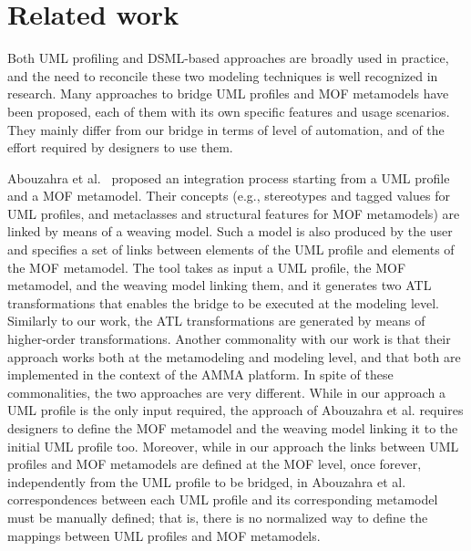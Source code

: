 \section{Related work}\label{sec:related}

Both UML profiling and DSML-based approaches are broadly used in practice, and the need to reconcile these two
modeling techniques is well recognized in research. Many approaches to bridge UML profiles and MOF metamodels have been proposed, each of them with its own specific features and usage scenarios. They mainly differ from our bridge in terms of level of automation, and of the effort required by designers to use them.

Abouzahra et al.~\cite{Abouzahra} proposed an integration process starting from a UML profile and a MOF metamodel.
Their concepts (e.g., stereotypes and tagged values for UML profiles, and metaclasses and structural features for MOF metamodels)
are linked by means of a weaving model. Such a model is also produced by the user and specifies a set of links between elements
of the UML profile and elements of the MOF metamodel. The tool takes as input a UML profile, the MOF metamodel, and the weaving model linking them, and it generates two ATL transformations that enables the bridge to be executed at the modeling level. Similarly to our work, the ATL transformations are generated by means of higher-order transformations. Another commonality with our work is that their approach works both at the metamodeling and modeling level, and that both are implemented in the context of the AMMA platform. In spite of these commonalities, the two approaches are very different. While in our approach a UML profile is the only input required, the approach of Abouzahra et al. requires designers to define the MOF metamodel and the weaving model linking it to the initial UML profile too.
Moreover, while in our approach the links between UML profiles and MOF metamodels are defined at the MOF level, once forever, independently from the UML profile to be bridged, in Abouzahra et al. correspondences between each UML profile and its corresponding metamodel must be manually defined; that is, there is no normalized way to define the mappings between UML profiles and MOF metamodels.


